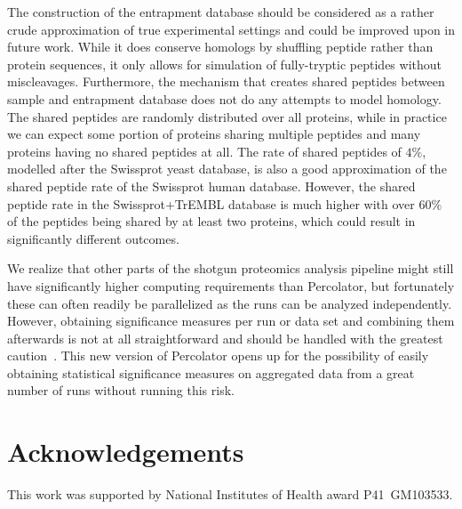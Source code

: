\documentclass{article}
\begin{document}
The construction of the entrapment database should be considered as a 
rather crude approximation of true experimental settings and could be 
improved upon in future work. While it does conserve homologs by 
shuffling peptide rather than protein sequences, it only allows for 
simulation of fully-tryptic peptides without miscleavages. 
Furthermore, the mechanism that creates shared peptides between sample 
and entrapment database does not do any attempts to model homology. 
The shared peptides are randomly distributed over all proteins, while 
in practice we can expect some portion of proteins sharing multiple 
peptides and many proteins having no shared peptides at all. The rate 
of shared peptides of $4\%$, modelled after the Swissprot yeast 
database, is also a good approximation of the shared peptide rate of 
the Swissprot human database. However, the shared peptide rate in the 
Swissprot+TrEMBL database is much higher with over $60\%$ of the 
peptides being shared by at least two proteins, which could result in 
significantly different outcomes.

We realize that other parts of the shotgun proteomics analysis
pipeline might still have significantly higher computing requirements
than Percolator, but fortunately these can often readily be
parallelized as the runs can be analyzed independently. However,
obtaining significance measures per run or data set and combining them
afterwards is not at all straightforward and should be handled with
the greatest caution~\cite{serang2015solution}. This new version of
Percolator opens up for the possibility of easily obtaining
statistical significance measures on aggregated data from a great
number of runs without running this risk.

\section*{Acknowledgements}

This work was supported by National Institutes of Health award P41~GM103533.




\end{document}
